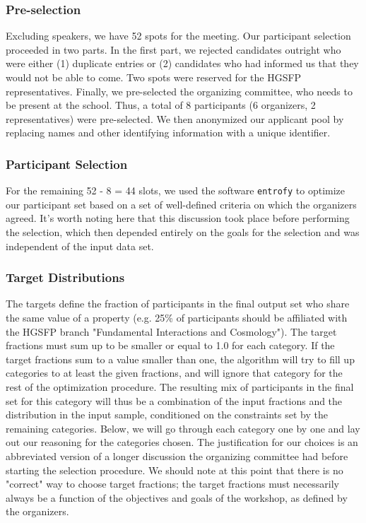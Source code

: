 \subsubsection*{Pre-selection}
Excluding speakers, we have 52 spots for the meeting. Our participant selection proceeded in two parts. In the first part, we rejected candidates outright who were either (1) duplicate entries or (2) candidates who had informed us that they would not be able to come. Two spots were reserved for the HGSFP representatives. Finally, we pre-selected the organizing committee, who needs to be present at the school. Thus, a total of 8 participants (6 organizers, 2 representatives) were pre-selected. We then anonymized our applicant pool by replacing names and other identifying information with a unique identifier. 

\subsubsection*{Participant Selection}
For the remaining 52 - 8 = 44 slots, we used the software \texttt{entrofy} to optimize our participant set based on a set of well-defined criteria on which the organizers agreed. It's worth noting here that this discussion took place before performing the selection, which then depended entirely on the goals for the selection and was independent of the input data set. 

\subsubsection*{Target Distributions}
The targets define the fraction of participants in the final output set who share the same value of a property (e.g. 25\% of participants should be affiliated with the HGSFP branch "Fundamental Interactions and Cosmology"). The target fractions must sum up to be smaller or equal to 1.0 for each category. If the target fractions sum to a value smaller than one, the algorithm will try to fill up categories to at least the given fractions, and will ignore that category for the rest of the optimization procedure. The resulting mix of participants in the final set for this category will thus be a combination of the input fractions and the distribution in the input sample, conditioned on the constraints set by the remaining categories. Below, we will go through each category one by one and lay out our reasoning for the categories chosen. The justification for our choices is an abbreviated version of a longer discussion the organizing committee had before starting the selection procedure. We should note at this point that there is no "correct" way to choose target fractions; the target fractions must necessarily always be a function of the objectives and goals of the workshop, as defined by the organizers.


